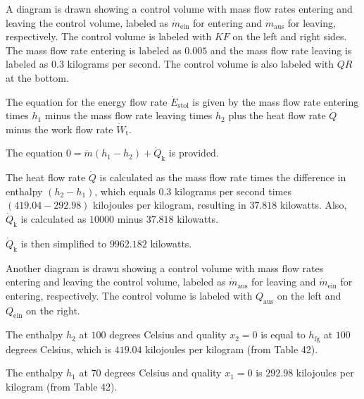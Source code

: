 A diagram is drawn showing a control volume with mass flow rates entering and leaving the control volume, labeled as $\dot{m}_{\text{ein}}$ for entering and $\dot{m}_{\text{aus}}$ for leaving, respectively. The control volume is labeled with $KF$ on the left and right sides. The mass flow rate entering is labeled as $0.005$ and the mass flow rate leaving is labeled as $0.3$ kilograms per second. The control volume is also labeled with $QR$ at the bottom.

The equation for the energy flow rate $\dot{E}_{\text{stol}}$ is given by the mass flow rate entering times $h_1$ minus the mass flow rate leaving times $h_2$ plus the heat flow rate $\dot{Q}$ minus the work flow rate $\dot{W}_{\text{t}}$.

The equation $0 = \dot{m} (h_1 - h_2) + \dot{Q}_{\text{k}}$ is provided.

The heat flow rate $\dot{Q}$ is calculated as the mass flow rate times the difference in enthalpy $(h_2 - h_1)$, which equals $0.3$ kilograms per second times $(419.04 - 292.98)$ kilojoules per kilogram, resulting in $37.818$ kilowatts. Also, $\dot{Q}_{\text{k}}$ is calculated as $10000$ minus $37.818$ kilowatts.

$\dot{Q}_{\text{k}}$ is then simplified to $9962.182$ kilowatts.

Another diagram is drawn showing a control volume with mass flow rates entering and leaving the control volume, labeled as $\dot{m}_{\text{aus}}$ for leaving and $\dot{m}_{\text{ein}}$ for entering, respectively. The control volume is labeled with $Q_{\text{aus}}$ on the left and $Q_{\text{ein}}$ on the right.

The enthalpy $h_2$ at $100$ degrees Celsius and quality $x_2 = 0$ is equal to $h_{\text{fg}}$ at $100$ degrees Celsius, which is $419.04$ kilojoules per kilogram (from Table 42).

The enthalpy $h_1$ at $70$ degrees Celsius and quality $x_1 = 0$ is $292.98$ kilojoules per kilogram (from Table 42).